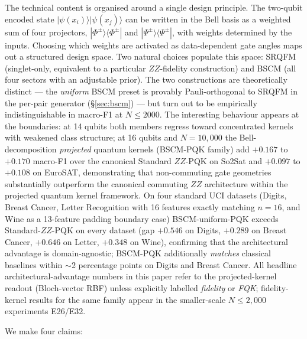 \documentclass[pdflatex,sn-mathphys]{sn-jnl}
\theoremstyle{plain}
\theoremstyle{remark}
\theoremstyle{definition}
\begin{document}
The technical content is organised around a single design principle. The two-qubit encoded state $|\psi(x_i)\rangle|\psi(x_j)\rangle$ can be written in the Bell basis as a weighted sum of four projectors, $|\Phi^\pm\rangle\!\langle\Phi^\pm|$ and $|\Psi^\pm\rangle\!\langle\Psi^\pm|$, with weights determined by the inputs. Choosing which weights are activated as data-dependent gate angles maps out a structured design space. Two natural choices populate this space: SRQFM (singlet-only, equivalent to a particular $ZZ$-fidelity construction) and BSCM (all four sectors with an adjustable prior). The two constructions are theoretically distinct --- the \emph{uniform} BSCM preset is provably Pauli-orthogonal to SRQFM in the per-pair generator (\S\ref{sec:bscm}) --- but turn out to be empirically indistinguishable in macro-F1 at $N\le 2000$. The interesting behaviour appears at the boundaries: at 14 qubits both members regress toward concentrated kernels with weakened class structure; at 16 qubits and $N=10{,}000$ the Bell-decomposition \emph{projected} quantum kernels (BSCM-PQK family) add $+0.167$ to $+0.170$ macro-F1 over the canonical Standard $ZZ$-PQK on So2Sat and $+0.097$ to $+0.108$ on EuroSAT, demonstrating that non-commuting gate geometries substantially outperform the canonical commuting $ZZ$ architecture within the projected quantum kernel framework. On four standard UCI datasets (Digits, Breast Cancer, Letter Recognition with 16 features exactly matching $n=16$, and Wine as a 13-feature padding boundary case) BSCM-uniform-PQK exceeds Standard-$ZZ$-PQK on every dataset (gap $+0.546$ on Digits, $+0.289$ on Breast Cancer, $+0.646$ on Letter, $+0.348$ on Wine), confirming that the architectural advantage is domain-agnostic; BSCM-PQK additionally \emph{matches} classical baselines within $\sim$2 percentage points on Digits and Breast Cancer.  All headline architectural-advantage numbers in this paper refer to the projected-kernel readout (Bloch-vector RBF) unless explicitly labelled \emph{fidelity} or \emph{FQK}; fidelity-kernel results for the same family appear in the smaller-scale $N\!\le\!2{,}000$ experiments E26/E32.

We make four claims:
\end{document}
